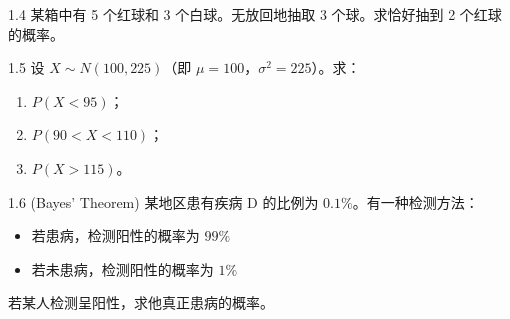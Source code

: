 \begin{exercise}{1.4}
某箱中有 5 个红球和 3 个白球。无放回地抽取 3 个球。求恰好抽到 2 个红球的概率。
\end{exercise}

\begin{exercise}{1.5}
设 $X \sim N(100, 225)$（即 $\mu = 100$，$\sigma^2 = 225$）。求：
\begin{enumerate}
    \item $P(X < 95)$；
    \item $P(90 < X < 110)$；
    \item $P(X > 115)$。
\end{enumerate}
\end{exercise}

\begin{exercise}{1.6 (Bayes' Theorem)}
某地区患有疾病 D 的比例为 $0.1\%$。有一种检测方法：
\begin{itemize}
    \item 若患病，检测阳性的概率为 $99\%$
    \item 若未患病，检测阳性的概率为 $1\%$
\end{itemize}
若某人检测呈阳性，求他真正患病的概率。
\end{exercise}
